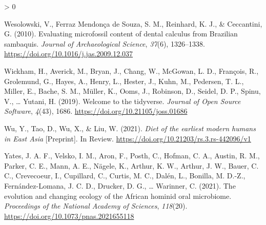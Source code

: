 \documentclass[
]{article}
\newlength{\cslhangindent}
\newenvironment{CSLReferences}[2] %
 {%
  \setlength{\parindent}{0pt}
  \ifodd #1 \everypar{\setlength{\hangindent}{\cslhangindent}}\ignorespaces\fi
  \ifnum #2 > 0
  \setlength{\parskip}{#2\baselineskip}
  \fi
 }%
 {}
\begin{document}
\begin{CSLReferences}{1}{0}
\leavevmode\hypertarget{ref-wesolowskiEvaluatingMicrofossilContent2010}{}%
Wesolowski, V., Ferraz Mendonça de Souza, S. M., Reinhard, K. J., \& Ceccantini, G. (2010). Evaluating microfossil content of dental calculus from {Brazilian} sambaquis. \emph{Journal of Archaeological Science}, \emph{37}(6), 1326--1338. \url{https://doi.org/10.1016/j.jas.2009.12.037}

\leavevmode\hypertarget{ref-tidyverse2019}{}%
Wickham, H., Averick, M., Bryan, J., Chang, W., McGowan, L. D., François, R., Grolemund, G., Hayes, A., Henry, L., Hester, J., Kuhn, M., Pedersen, T. L., Miller, E., Bache, S. M., Müller, K., Ooms, J., Robinson, D., Seidel, D. P., Spinu, V., \ldots{} Yutani, H. (2019). Welcome to the {tidyverse}. \emph{Journal of Open Source Software}, \emph{4}(43), 1686. \url{https://doi.org/10.21105/joss.01686}

\leavevmode\hypertarget{ref-wuDietEarliest2021}{}%
Wu, Y., Tao, D., Wu, X., \& Liu, W. (2021). \emph{Diet of the earliest modern humans in {East Asia}} {[}Preprint{]}. {In Review}. \url{https://doi.org/10.21203/rs.3.rs-442096/v1}

\leavevmode\hypertarget{ref-yatesOralMicrobiome2021}{}%
Yates, J. A. F., Velsko, I. M., Aron, F., Posth, C., Hofman, C. A., Austin, R. M., Parker, C. E., Mann, A. E., Nägele, K., Arthur, K. W., Arthur, J. W., Bauer, C. C., Crevecoeur, I., Cupillard, C., Curtis, M. C., Dalén, L., Bonilla, M. D.-Z., Fernández-Lomana, J. C. D., Drucker, D. G., \ldots{} Warinner, C. (2021). The evolution and changing ecology of the {African} hominid oral microbiome. \emph{Proceedings of the National Academy of Sciences}, \emph{118}(20). \url{https://doi.org/10.1073/pnas.2021655118}

\end{CSLReferences}
\end{document}
